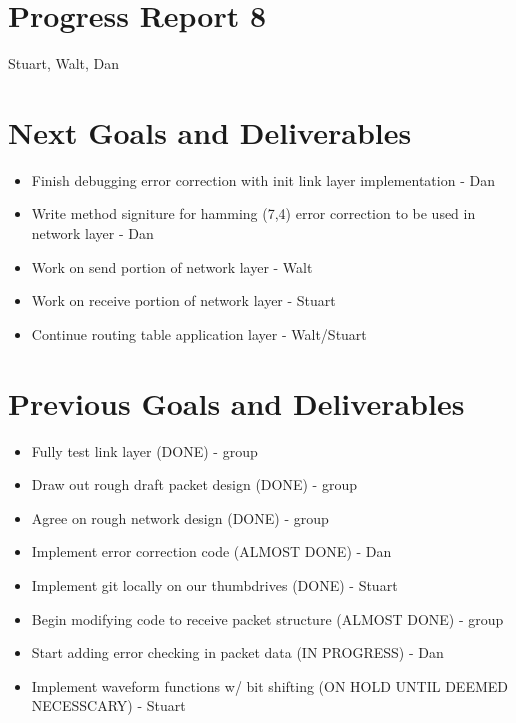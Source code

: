 \documentclass{article}
\begin{document}
\section*{Progress Report 8}
Stuart, Walt, Dan

\section*{Next Goals and Deliverables}
\begin{itemize}
    \item Finish debugging error correction with init link layer implementation - Dan
    \item Write method signiture for hamming (7,4) error correction to be used in network layer - Dan
    \item Work on send portion of network layer - Walt
    \item Work on receive portion of network layer - Stuart
    \item Continue routing table application layer - Walt/Stuart
\end{itemize}

\section*{Previous Goals and Deliverables}
\begin{itemize}
    \item Fully test link layer (DONE) - group
    \item Draw out rough draft packet design (DONE) - group
    \item Agree on rough network design (DONE) - group
    \item Implement error correction code (ALMOST DONE) - Dan
    \item Implement git locally on our thumbdrives (DONE) - Stuart
    \item Begin modifying code to receive packet structure (ALMOST DONE) - group
    \item Start adding error checking in packet data (IN PROGRESS) - Dan
    \item Implement waveform functions w/ bit shifting (ON HOLD UNTIL DEEMED NECESSCARY) - Stuart
\end{itemize}
\end{document}
